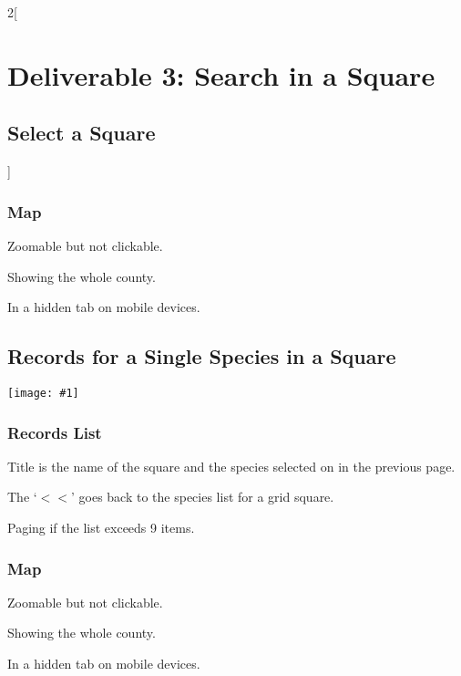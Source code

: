 \documentclass[a4paper,12pt,landscape]{article}
\newcommand{\wireframe}[1]{\texttt{[image: \#1]}\clearpage}
\begin{document}
\begin{multicols*}{2}[%
  \section{Deliverable 3: Search in a Square}%
  \subsection{Select a Square}%
]
\subsubsection*{Map}

\begin{todolist}
  \item Zoomable but not clickable.
  \item Showing the whole county.
  \item In a hidden tab on mobile devices.
\end{todolist}

\clearpage

\subsection{Records for a Single Species in a Square}

\wireframe{./wireframes/Records__SingleSpeciesForSquare.png}%

\subsubsection*{Records List}

\begin{todolist}
  \item Title is the name of the square and the species selected on in the previous page.
  \item The `$<<$' goes back to the species list for a grid square.
  \item Paging if the list exceeds 9 items.
\end{todolist}

\subsubsection*{Map}

\begin{todolist}
  \item Zoomable but not clickable.
  \item Showing the whole county.
  \item In a hidden tab on mobile devices.
\end{todolist}


\clearpage
\end{multicols*}
\end{document}
